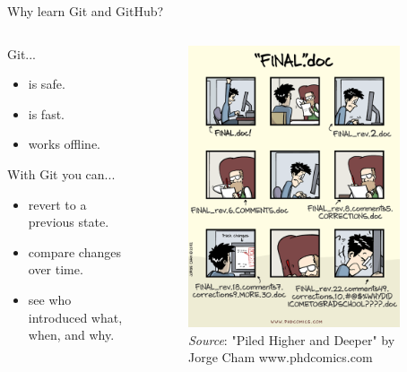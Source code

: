 \documentclass[handout]{beamer}
\begin{document}
\begin{frame}{Why learn Git and GitHub?}
\begin{columns}
\begin{column}{0.5\textwidth}
	Git...
	\begin{itemize}
		\item is safe.
		\item is fast.
		\item works offline.
	\end{itemize}
  With Git you can...
	\begin{itemize}
		\item revert to a previous state.
		\item compare changes over time.
		\item see who introduced what, when, and why.
	\end{itemize}
\end{column}
\begin{column}{0.5\textwidth}
\begin{figure}
	\includegraphics[width=0.9\textwidth]{figures/final_phdcomics.png}
	\caption{\textit{Source}: "Piled Higher and Deeper" by Jorge Cham
www.phdcomics.com}
\end{figure}
\end{column}
\end{columns}
\end{frame}
\end{document}

